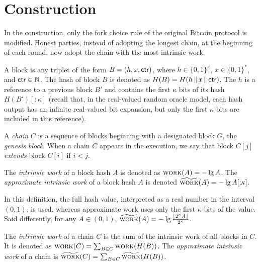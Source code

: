 \section{Construction}
In the \poem construction, only the fork choice rule
of the original Bitcoin protocol is modified.
Honest parties, instead of adopting the longest chain, at the beginning
of each round, now adopt the chain with the most intrinsic work.

A block is any triplet of the
form $B = (h, x, \textsf{ctr})$, where $h \in \{0,1\}^\kappa$, $x \in \{0, 1\}^*$, and $\textsf{ctr} \in \mathbb{N}$.
The hash of block $B$ is denoted as $H(B) = H(h \,\|\, x \,\|\, \textsf{ctr})$.
The $h$ is a reference to a previous block $B'$ and
contains the first $\kappa$ bits of its hash $H(B')[{:}{\kappa}]$
(recall that, in the real-valued random oracle model, each hash
output has an infinite real-valued bit expansion, but only the first
$\kappa$ bits are included in this reference).

A \emph{chain} $C$ is a sequence of blocks beginning with a designated
block $G$, the \emph{genesis block}. When a chain $C$ appears in the execution,
we say that block $C[j]$ \emph{extends} block $C[i]$ if $i < j$.

\begin{definition}
  The \emph{intrinsic work} of a block hash
  $A$ is denoted as $\textsc{work}(A) = -\lg A$.
  The \emph{approximate intrinsic work} of a block hash $A$ is denoted
  $\widetilde{\textsc{work}}(A) = -\lg A[{:}{\kappa}]$.
\end{definition}

In this definition, the full hash value, interpreted as a real number in the interval
$(0, 1)$, is used, whereas approximate work uses only the first $\kappa$ bits of the
value. Said differently, for any $A \in (0, 1)$,
$\widetilde{\textsc{work}}(A) = -\lg \frac{\lfloor 2^\kappa A \rfloor}{2^\kappa}$.

\begin{definition}
  The \emph{intrinsic work} of a chain
  $C$ is the sum of the
  intrinsic work of all blocks in $C$.
  It is denoted as $\textsc{work}(C) = \sum_{B \in C}{\textsc{work}(H(B))}$.
  The \emph{approximate intrinsic work} of a chain
  is $\widetilde{\textsc{work}}(C) = \sum_{B \in C}{\widetilde{\textsc{work}}(H(B))}$.
\end{definition}

